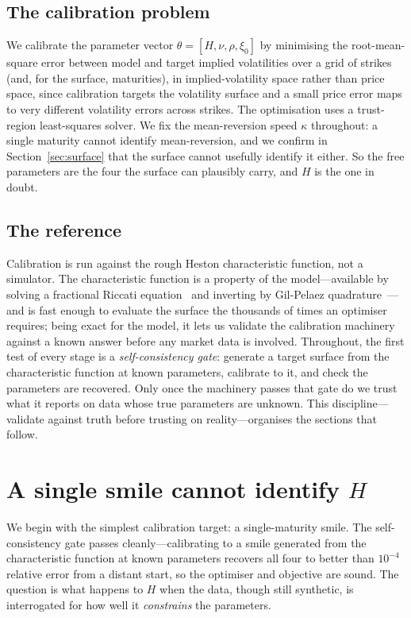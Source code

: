 \documentclass[11pt,a4paper]{article}
\numberwithin{equation}{section}
\begin{document}
\subsection{The calibration problem}

We calibrate the parameter vector $\theta=[H,\nu,\rho,\xi_0]$ by minimising the
root-mean-square error between model and target implied volatilities over a grid of strikes
(and, for the surface, maturities), in implied-volatility space rather than price space, since
calibration targets the volatility surface and a small price error maps to very different
volatility errors across strikes. The optimisation uses a trust-region least-squares solver.
We fix the mean-reversion speed $\kappa$ throughout: a single maturity cannot identify
mean-reversion, and we confirm in Section~\ref{sec:surface} that the surface cannot usefully
identify it either. So the free parameters are the four the surface can plausibly carry, and
$H$ is the one in doubt.

\subsection{The reference}

Calibration is run against the rough Heston characteristic function, not a simulator. The
characteristic function is a property of the model---available by solving a fractional Riccati
equation~\citep{eer2019} and inverting by Gil-Pelaez quadrature~\citep{gilpelaez1951}---and is
fast enough to evaluate the surface the thousands of times an optimiser requires; being exact for
the model, it lets us validate
the calibration machinery against a known answer before any market data is involved. Throughout,
the first test of every stage is a \emph{self-consistency gate}: generate a target surface from
the characteristic function at known parameters, calibrate to it, and check the parameters are
recovered. Only once the machinery passes that gate do we trust what it reports on data whose
true parameters are unknown. This discipline---validate against truth before trusting on
reality---organises the sections that follow.

\section{A single smile cannot identify \texorpdfstring{$H$}{H}}\label{sec:single}

We begin with the simplest calibration target: a single-maturity smile. The self-consistency
gate passes cleanly---calibrating to a smile generated from the characteristic function at known
parameters recovers all four to better than $10^{-4}$ relative error from a distant start, so the
optimiser and objective are sound. The question is what happens to $H$ when the data, though still
synthetic, is interrogated for how well it \emph{constrains} the parameters.
\end{document}
